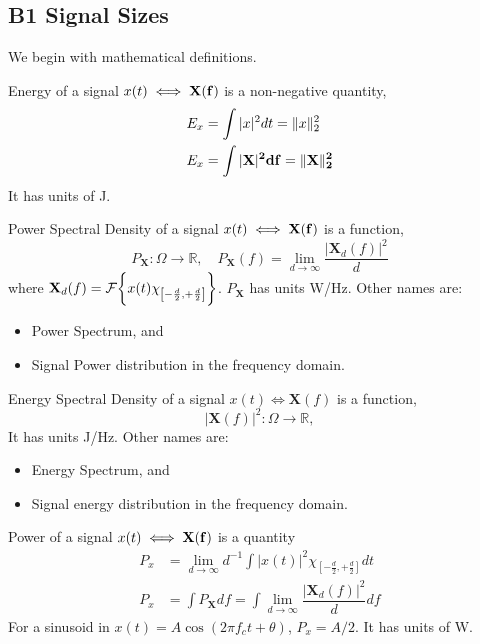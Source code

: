 \documentclass[../../main.tex]{subfiles}
\begin{document}
\newcommand{\pxf}{P_{\mathbf{X}}(f)}
\newcommand{\pyf}{P_{\mathbf{y}}(f)}
\newcommand{\hf}{\mathbf{H}(f)}
\newcommand{\xf}{\mathbf{X}(f)}
\newcommand{\yf}{\mathbf{Y}(f)}
\subsection{B1 Signal Sizes}
We begin with mathematical definitions.
\begin{definition}
    Energy of a signal $x(t)\iff \bf{X}(f)$ is a non-negative quantity,
    \begin{align*}
        E_x&=\int |x|^2dt = \norm{x}_2^2\\
        E_x&= \int |\bf{X}|^2df = \norm{\bf{X}}_2^2
    \end{align*}
    It has units of J.
\end{definition}
\begin{definition}
    Power Spectral Density of a signal $x(t)\iff \bf{X}(f)$ is a function,
    \[
    P_{\mathbf{X}}:\Omega\to\mathbb{R},\quad P_{\mathbf{X}} (f) = \lim_{d\to\infty} \dfrac{|\mathbf{X}_d (f)|^2}{d}
    \]
    where $\mathbf{X}_d (f) = \cal{F}\biggl\{x(t)\chi_{\left[-\frac{d}{2},+\frac{d}{2}\right]}\biggr\}$. $P_{\mathbf{X}}$ has units W/Hz. Other names are:
    \begin{itemize}
        \item Power Spectrum, and
        \item Signal Power distribution in the frequency domain.
    \end{itemize}
\end{definition}
\begin{definition}
    Energy Spectral Density of a signal $x(t)\iff \mathbf{X}(f)$ is a function,
    \[
    |\mathbf{X}(f)|^2: \Omega\to\mathbb{R},
    \]
    It has units J/Hz. Other names are:
    \begin{itemize}
        \item Energy Spectrum, and
        \item Signal energy distribution in the frequency domain.
    \end{itemize}
\end{definition}
\begin{definition}
    Power of a signal $x(t)\iff \bf{X}(f)$ is a quantity
    \begin{align*}
    P_x &= \lim_{d\to\infty}d^{-1}\int|x(t)|^2\chi_{\left[-\frac{d}{2},+\frac{d}{2}\right]}dt\\[2ex]
    P_x &= \int P_{\mathbf{X}}df = \int \lim_{d\to\infty}\dfrac{|\mathbf{X}_d(f)|^2}{d}df
    \end{align*}
    For a sinusoid in $x(t)=A\cos(2\pi f_c t+\theta)$, $P_x=A/2$. It has units of W.
\end{definition}
\end{document}
